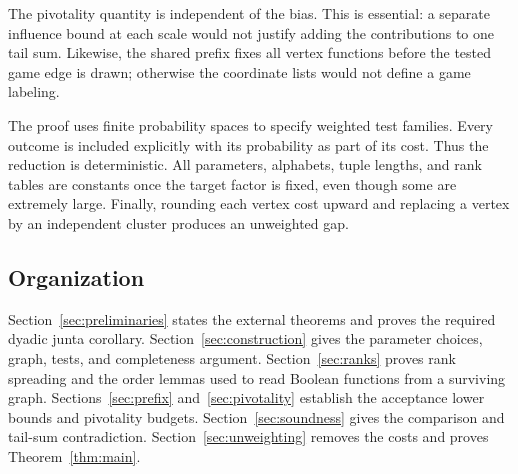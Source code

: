 The pivotality quantity is independent of the bias. This is essential:
a separate influence bound at each scale would not justify adding the
contributions to one tail sum. Likewise, the shared prefix fixes all
vertex functions before the tested game edge is drawn; otherwise the
coordinate lists would not define a game labeling.

The proof uses finite probability spaces to specify weighted test
families. Every outcome is included explicitly with its probability
as part of its cost. Thus the reduction is deterministic. All
parameters, alphabets, tuple lengths, and rank tables are constants
once the target factor is fixed, even though some are extremely
large. Finally, rounding each vertex cost upward and replacing a
vertex by an independent cluster produces an unweighted gap.

\subsection{Organization}

Section~\ref{sec:preliminaries} states the external theorems and proves
the required dyadic junta corollary.
Section~\ref{sec:construction} gives the parameter choices, graph,
tests, and completeness argument. Section~\ref{sec:ranks} proves rank
spreading and the order lemmas used to read Boolean functions from a
surviving graph. Sections~\ref{sec:prefix} and~\ref{sec:pivotality}
establish the acceptance lower bounds and pivotality budgets.
Section~\ref{sec:soundness} gives the comparison and tail-sum
contradiction. Section~\ref{sec:unweighting} removes the costs and
proves Theorem~\ref{thm:main}.
